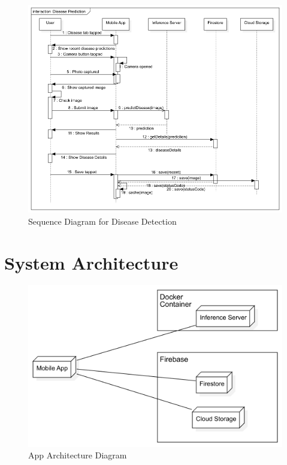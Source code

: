 \documentclass[../Report.tex]{subfiles}
\begin{document}
\begin{figure}[H]
    \centering
    \includegraphics[width=0.95\linewidth]{images/seq_disease.png}
    \caption{Sequence Diagram for Disease Detection}
    \label{fig:seq_2}
\end{figure}

\section{System Architecture}
\begin{figure}[H]
    \centering
    \includegraphics[width=0.95\linewidth]{images/architecture.png}
    \caption{App Architecture Diagram}
    \label{fig:architecture}
\end{figure}
\end{document}
